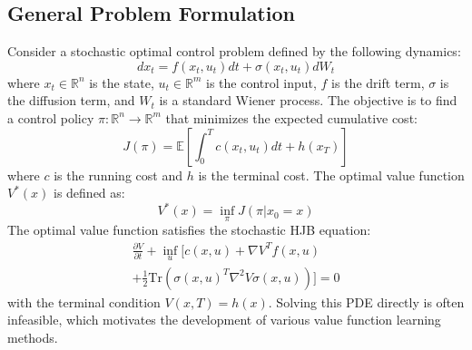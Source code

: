 \subsection{General Problem Formulation}
Consider a stochastic optimal control problem defined by the following dynamics:
\begin{equation}\label{eqn:stochastic_dynamics}
dx_t = f(x_t, u_t)dt + \sigma(x_t, u_t)dW_t
\end{equation}
where $x_t \in \mathbb{R}^n$ is the state, $u_t \in \mathbb{R}^m$ is the control input, $f$ is the drift term, $\sigma$ is the diffusion term, and $W_t$ is a standard Wiener process. The objective is to find a control policy $\pi: \mathbb{R}^n \rightarrow \mathbb{R}^m$ that minimizes the expected cumulative cost:
\begin{equation}\label{eqn:cost_function}
J(\pi) = \mathbb{E}\left[ \int_0^T c(x_t, u_t) dt + h(x_T) \right]
\end{equation}
where $c$ is the running cost and $h$ is the terminal cost. The optimal value function $V^*(x)$ is defined as:
\begin{equation}\label{eqn:value_function}
V^*(x) = \inf_{\pi} J(\pi | x_0 = x)
\end{equation}
The optimal value function satisfies the stochastic HJB equation:
\begin{equation}\label{eqn:stochastic-HJB}
\begin{aligned}
\frac{\partial V}{\partial t} + \inf_{u} \Big[ c(x, u) + \nabla V^T f(x, u) \\
+ \frac{1}{2} \text{Tr}(\sigma(x, u)^T \nabla^2 V \sigma(x, u)) \Big] = 0
\end{aligned}
\end{equation}
with the terminal condition $V(x, T) = h(x)$. Solving this PDE directly is often infeasible, which motivates the development of various value function learning methods.

